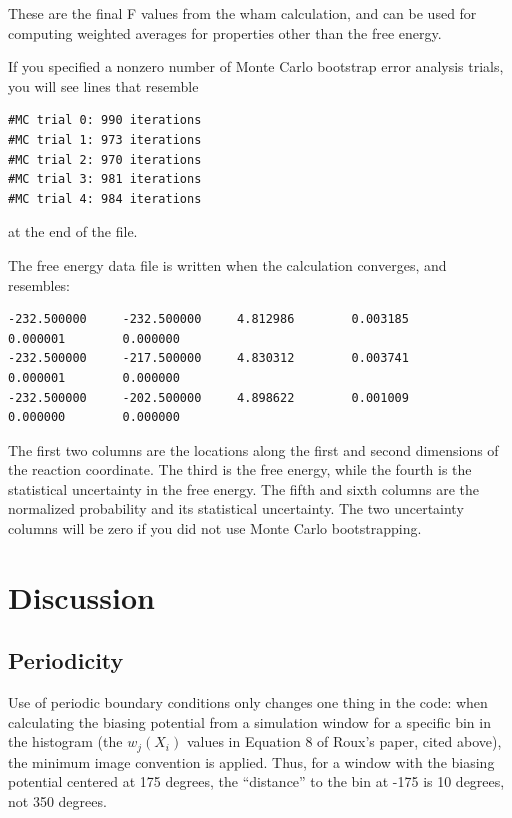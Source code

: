 \documentclass[12pt]{article}
\begin{document}
These are the final F values from the wham calculation, and can be used for
computing weighted averages for properties other than the free energy.

If you specified a nonzero number of Monte Carlo bootstrap error analysis
trials, you will see lines that resemble

\begin{verbatim}
#MC trial 0: 990 iterations
#MC trial 1: 973 iterations
#MC trial 2: 970 iterations
#MC trial 3: 981 iterations
#MC trial 4: 984 iterations
\end{verbatim}
at the end of the file.

The free energy data file is written when the calculation converges, and
resembles:

\begin{footnotesize}
\begin{verbatim}
-232.500000     -232.500000     4.812986        0.003185        0.000001        0.000000
-232.500000     -217.500000     4.830312        0.003741        0.000001        0.000000
-232.500000     -202.500000     4.898622        0.001009        0.000000        0.000000
\end{verbatim}
\end{footnotesize}


The first two columns are the locations along the first and second
dimensions of the reaction coordinate.  The third is the free energy, while
the fourth is the statistical uncertainty in the free energy.  The fifth
and sixth columns are the normalized probability and its statistical
uncertainty.  The two uncertainty columns will be zero if you did not use
Monte Carlo bootstrapping.

\section{Discussion}

\subsection{Periodicity}

Use of periodic boundary conditions only changes one thing in the
code: when calculating the biasing potential from a simulation window for a
specific bin in the histogram (the $w_j(X_i)$ values in Equation 8 of Roux's
paper, cited above), the minimum image convention is applied.  Thus, for a
window with the biasing potential centered at 175 degrees, the ``distance''
to the bin at -175 is 10 degrees, not 350 degrees.
\end{document}
